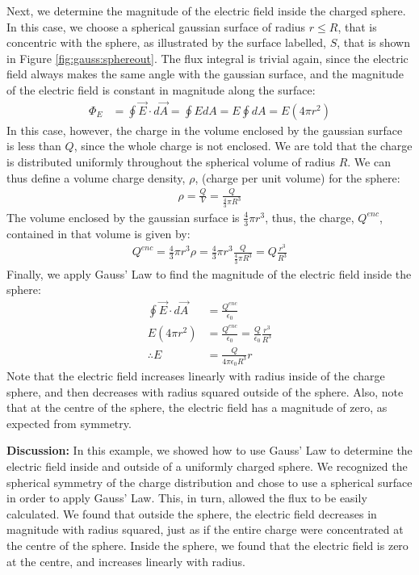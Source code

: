 \begin{example}
Next, we determine the magnitude of the electric field inside the charged sphere. In this case, we choose a spherical gaussian surface of radius $r\leq R$, that is concentric with the sphere, as illustrated by the surface labelled, $S$, that is shown in Figure \ref{fig:gauss:sphereout}.
The flux integral is trivial again, since the electric field always makes the same angle with the gaussian surface, and the magnitude of the electric field is constant in magnitude along the surface:
\begin{align*}
\Phi_E&=\oint \vec E\cdot d\vec A=\oint E dA= E\oint dA=E(4\pi r^2)
\end{align*}
In this case, however, the charge in the volume enclosed by the gaussian surface is less than $Q$, since the whole charge is not enclosed. We are told that the charge is distributed uniformly throughout the spherical volume of radius $R$. We can thus define a volume charge density, $\rho$, (charge per unit volume) for the sphere:
\begin{align*}
\rho=\frac{Q}{V}=\frac{Q}{\frac{4}{3}\pi R^3}
\end{align*}
The volume enclosed by the gaussian surface is $\frac{4}{3}\pi r^3$, thus, the charge, $Q^{enc}$, contained in that volume is given by:
\begin{align*}
Q^{enc}=\frac{4}{3}\pi r^3 \rho=\frac{4}{3}\pi r^3 \frac{Q}{\frac{4}{3}\pi R^3}=Q\frac{r^3}{R^3}
\end{align*}
Finally, we apply Gauss' Law to find the magnitude of the electric field inside the sphere:
\begin{align*}
\oint \vec E\cdot d\vec A&=\frac{Q^{enc}}{\epsilon_0} \\
E(4\pi r^2) &= \frac{Q^{enc}}{\epsilon_0}=\frac{Q}{\epsilon_0}\frac{r^3}{R^3}\\
\therefore E&= \frac{Q}{4\pi\epsilon_0R^3}r
\end{align*}
Note that the electric field increases linearly with radius inside of the charge sphere, and then decreases with radius squared outside of the sphere. Also, note that at the centre of the sphere, the electric field has a magnitude of zero, as expected from symmetry.

\textbf{Discussion: } In this example, we showed how to use Gauss' Law to determine the electric field inside and outside of a uniformly charged sphere. We recognized the spherical symmetry of the charge distribution and chose to use a spherical surface in order to apply Gauss' Law. This, in turn, allowed the flux to be easily calculated. We found that outside the sphere, the electric field decreases in magnitude with radius squared, just as if the entire charge were concentrated at the centre of the sphere. Inside the sphere, we found that the electric field is zero at the centre, and increases linearly with radius. 
\end{example}
